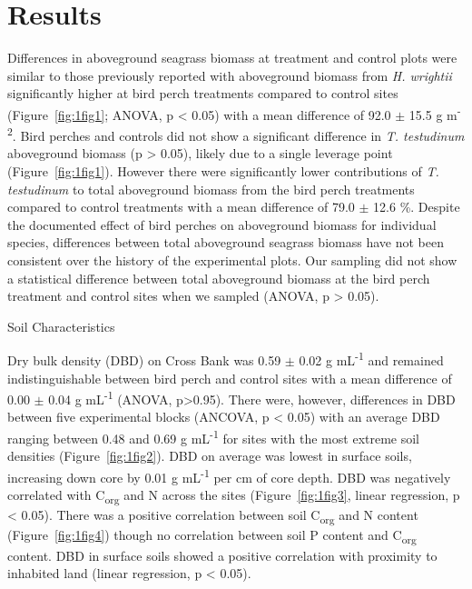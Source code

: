 \section{Results}

	Differences in aboveground seagrass biomass at treatment and control plots were similar to those previously reported \citep{Powell:1991va, Fourqurean:1995uj, Herbert:2008di} with aboveground biomass from \textit{H. wrightii} significantly higher at bird perch treatments compared to control sites (Figure~\ref{fig:1fig1}; ANOVA, p < 0.05) with a mean difference of 92.0 $\pm$ 15.5 g m\textsuperscript{-2}. Bird perches and controls did not show a significant difference in \textit{T. testudinum} aboveground biomass (p > 0.05), likely due to a single leverage point (Figure~\ref{fig:1fig1}). However there were significantly lower contributions of \textit{T. testudinum} to total aboveground biomass from the bird perch treatments compared to control treatments with a mean difference of 79.0 $\pm$ 12.6 \%. Despite the documented effect of bird perches on aboveground biomass for individual species, differences between total aboveground seagrass biomass have not been consistent over the history of the experimental plots. Our sampling did not show a statistical difference between total aboveground biomass at the bird perch treatment and control sites when we sampled (ANOVA, p > 0.05).

\bigskip
\noindent Soil Characteristics
\medskip


	Dry bulk density (DBD) on Cross Bank was 0.59 $\pm$ 0.02 g mL\textsuperscript{-1} and remained indistinguishable between bird perch and control sites with a mean difference of 0.00 $\pm$ 0.04 g mL\textsuperscript{-1} (ANOVA, p>0.95). There were, however, differences in DBD between five experimental blocks (ANCOVA, p < 0.05) with an average DBD ranging between 0.48 and 0.69 g mL\textsuperscript{-1} for sites with the most extreme soil densities (Figure~\ref{fig:1fig2}). DBD on average was lowest in surface soils, increasing down core by 0.01 g mL\textsuperscript{-1} per cm of core depth. DBD was negatively correlated with C\textsubscript{org} and N across the sites (Figure~\ref{fig:1fig3}, linear regression, p < 0.05). There was a positive correlation between soil C\textsubscript{org} and N content (Figure~\ref{fig:1fig4}) though no correlation between soil P content and C\textsubscript{org} content. DBD in surface soils showed a positive correlation with proximity to inhabited land (linear regression, p < 0.05).

